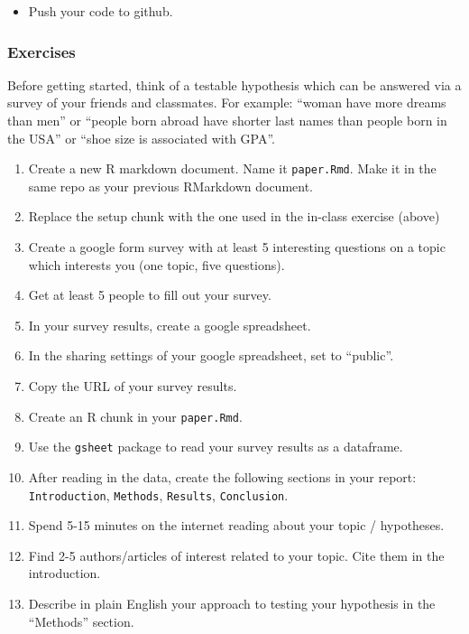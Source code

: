 \documentclass[
]{book}
\providecommand{\tightlist}{%
  \setlength{\itemsep}{0pt}\setlength{\parskip}{0pt}}
\begin{document}
\begin{itemize}
\tightlist
\item
  Push your code to github.
\end{itemize}

\hypertarget{exercises}{%
\subsubsection{Exercises}\label{exercises}}

Before getting started, think of a testable hypothesis which can be answered via a survey of your friends and classmates. For example: ``woman have more dreams than men'' or ``people born abroad have shorter last names than people born in the USA'' or ``shoe size is associated with GPA''.

\begin{enumerate}
\def\labelenumi{\arabic{enumi}.}
\item
  Create a new R markdown document. Name it \texttt{paper.Rmd}. Make it in the same repo as your previous RMarkdown document.
\item
  Replace the setup chunk with the one used in the in-class exercise (above)
\item
  Create a google form survey with at least 5 interesting questions on a topic which interests you (one topic, five questions).
\item
  Get at least 5 people to fill out your survey.
\item
  In your survey results, create a google spreadsheet.
\item
  In the sharing settings of your google spreadsheet, set to ``public''.
\item
  Copy the URL of your survey results.
\item
  Create an R chunk in your \texttt{paper.Rmd}.
\item
  Use the \texttt{gsheet} package to read your survey results as a dataframe.
\item
  After reading in the data, create the following sections in your report: \texttt{Introduction}, \texttt{Methods}, \texttt{Results}, \texttt{Conclusion}.
\item
  Spend 5-15 minutes on the internet reading about your topic / hypotheses.
\item
  Find 2-5 authors/articles of interest related to your topic. Cite them in the introduction.
\item
  Describe in plain English your approach to testing your hypothesis in the ``Methods'' section.

\end{enumerate}
\end{document}
